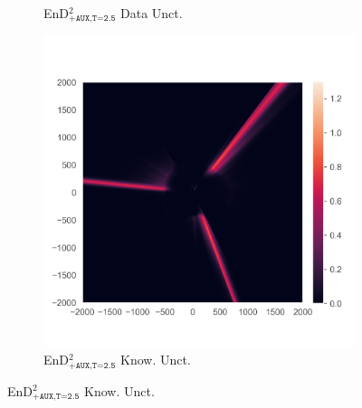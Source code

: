 \begin{figure}
\begin{subfigure}{0.22\textwidth}
  \caption{EnD$^2_{\texttt{+AUX,T=2.5}}$ Data Unct.}
  \label{fig:3n}
\end{subfigure}%
\begin{subfigure}{0.22\textwidth}
  \centering
  \includegraphics[trim=42 45 15 55, clip, width=\linewidth]{plots/3o.png}
  \caption{EnD$^2_{\texttt{+AUX,T=2.5}}$ Know. Unct.}
  \label{fig:3o}
\end{subfigure}%


\end{figure}
